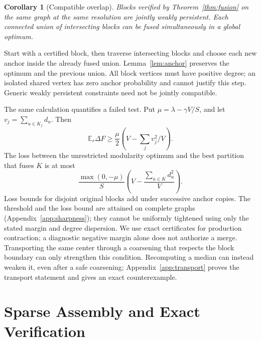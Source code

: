 \documentclass[sigconf,anonymous,review]{acmart}
\newtheorem{corollary}{Corollary}
\newcommand{\1}{\mathbf{1}}
\newcommand{\E}{\mathbb{E}}
\begin{document}
\begin{corollary}[Compatible overlap]\label{cor:overlap}
Blocks verified by Theorem~\ref{thm:fusion} on the same graph at the same
resolution are jointly weakly
persistent. Each connected union of intersecting blocks can be fused
simultaneously in a global optimum.
\end{corollary}
Start with a certified block, then traverse intersecting blocks and choose each
new anchor inside the already fused union. Lemma~\ref{lem:anchor} preserves the
optimum and the previous union. All block vertices must have positive degree;
an isolated shared vertex has zero anchor probability and cannot justify this
step. Generic weakly persistent constraints need not be jointly compatible.

The same calculation quantifies a failed test. Put
$\mu=\lambda-\gamma V/S$, and let $v_j=\sum_{u\in K_j}d_u$. Then
\begin{equation}
 \E_r\Delta F\geq\frac\mu 2\left(V-\sum_jv_j^2/V\right).
 \label{eq:quantgain}
\end{equation}
The loss between the unrestricted modularity optimum and the best partition
that fuses $K$ is at most
\begin{equation}
 \frac{\max(0,-\mu)}{S}\left(V-\frac{\sum_{u\in K}d_u^2}{V}\right).
 \label{eq:regret}
\end{equation}
Loss bounds for disjoint original blocks add under successive anchor copies.
The threshold and the loss bound are attained on complete graphs
(Appendix~\ref{app:sharpness}); they cannot be uniformly tightened using only
the stated margin and degree dispersion.
We use exact certificates for production contraction; a diagnostic negative
margin alone does not authorize a merge.
Transporting the same center through a coarsening that respects the block
boundary can only strengthen this condition. Recomputing a median can instead
weaken it, even after a safe coarsening; Appendix~\ref{app:transport} proves
the transport statement and gives an exact counterexample.

\section{Sparse Assembly and Exact Verification}
\end{document}
